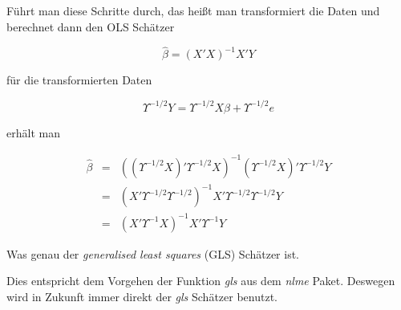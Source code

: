 \documentclass[12pt,a4paper]{article}
\theoremstyle{definition}
\theoremstyle{definition}
\theoremstyle{definition}
\theoremstyle{definition}
\begin{document}
Führt man diese Schritte durch, das heißt man transformiert die Daten und berechnet dann den OLS Schätzer 

\begin{equation*}
\hat{\beta} = (X' X)^{-1} X' Y
\end{equation*}

für die transformierten Daten 

\begin{equation*}
\Upsilon^{-1/2} Y = \Upsilon^{-1/2} X \beta + \Upsilon^{-1/2} e
\end{equation*}

erhält man

\begin{eqnarray*}
\hat{\beta} &=& ((\Upsilon^{-1/2} X)' \Upsilon^{-1/2} X)^{-1} (\Upsilon^{-1/2} X)' \Upsilon^{-1/2} Y \\
&=& (X' \Upsilon^{-1/2} \Upsilon^{-1/2})^{-1} X' \Upsilon^{-1/2} \Upsilon^{-1/2} Y \\
&=& (X' \Upsilon^{-1} X)^{-1} X' \Upsilon^{-1} Y
\end{eqnarray*}
 
Was genau der \textit{generalised least squares} (GLS) Schätzer ist.

Dies entspricht dem Vorgehen der Funktion \textit{gls} aus dem \textit{nlme} Paket. Deswegen wird in Zukunft immer direkt der \textit{gls} Schätzer benutzt.
\end{document}
